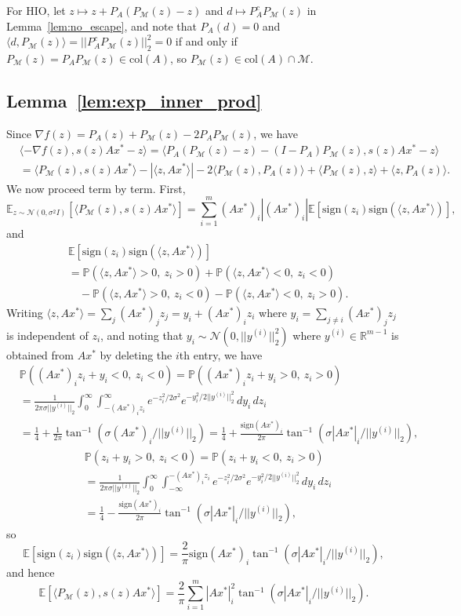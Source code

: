 \documentclass[12pt]{article}
\theoremstyle{definition}
\theoremstyle{remark}
\theoremstyle{definition}
\theoremstyle{problem}
\theoremstyle{definition}
\newcommand{\col}{\text{col}}
\newcommand{\sign}{\text{sign}}
\newcommand{\atan}{\tan^{-1}}
\newcommand{\RR}{\mathbb{R} }
\newcommand{\MM}{\mathcal{M}}
\newcommand{\PP}{\mathbb{P}}
\newcommand{\EE}{\mathbb{E}}
\begin{document}
For HIO, let $z\mapsto z + P_A(P_{\MM}(z)-z)$ and $d\mapsto P_A^cP_{\MM}(z)$ in Lemma~\ref{lem:no_escape}, and note that $P_A(d)=0$ and $\langle d,P_{\MM}(z)\rangle = ||P_A^cP_{\MM}(z)||_2^2 = 0$ if and only if $P_{\MM}(z)=P_AP_{\MM}(z)\in\col(A)$, so $P_{\MM}(z)\in\col(A)\cap\MM$.

\subsection{Lemma~\ref{lem:exp_inner_prod}}\label{sec:pf_exp_inner_prod}
Since $\nabla f(z) = P_A(z) + P_{\MM}(z) - 2P_AP_{\MM}(z)$, we have
\[\begin{aligned} &\langle -\nabla f(z), s(z)Ax^* - z\rangle = \langle P_A(P_{\MM}(z)-z) - (I-P_A)P_{\MM}(z), s(z)Ax^*-z\rangle
\\ &= \langle P_{\MM}(z), s(z)Ax^*\rangle - |\langle z, Ax^*\rangle| -2\langle P_{\MM}(z), P_A(z)\rangle + \langle P_{\MM}(z), z\rangle + \langle z, P_A(z)\rangle. \end{aligned}\]
We now proceed term by term. First,
\[ \EE_{z\sim \mathcal{N}(0,\sigma^2I)}\left[\langle P_{\MM}(z), s(z)Ax^*\rangle\right] = \sum_{i=1}^m(Ax^*)_i|(Ax^*)_i|\EE[\sign(z_i)\sign(\langle z,Ax^*\rangle)],\]
and
\[\begin{aligned}&\EE[\sign(z_i)\sign(\langle z,Ax^*\rangle)]\\
&= \PP(\langle z,Ax^*\rangle > 0,\ z_i>0) + \PP(\langle z,Ax^*\rangle < 0,\ z_i<0)\\
&\quad - \PP(\langle z,Ax^*\rangle > 0,\ z_i<0) - \PP(\langle z,Ax^*\rangle < 0,\ z_i>0).\end{aligned}\]
Writing $\langle z,Ax^*\rangle = \sum_j(Ax^*)_jz_j = y_i + (Ax^*)_iz_i$ where $y_i = \sum_{j\neq i}(Ax^*)_jz_j$ is independent of $z_i$, and noting that $y_i\sim \mathcal{N}(0, ||y^{(i)}||_2^2)$ where $y^{(i)}\in\RR^{m-1}$ is obtained from $Ax^*$ by deleting the $i$th entry, we have
\[\begin{aligned} &\PP((Ax^*)_iz_i + y_i < 0,\ z_i < 0) = \PP((Ax^*)_iz_i + y_i > 0,\ z_i > 0)\\
&= \frac{1}{2\pi\sigma||y^{(i)}||_2}\int_0^{\infty}\int_{-(Ax^*)_iz_i}^{\infty}e^{-z_i^2/2\sigma^2}e^{-y_i^2/2||y^{(i)}||_2^2}\, dy_i\, dz_i\\
&= \frac{1}{4} + \frac{1}{2\pi}\atan(\sigma(Ax^*)_i/||y^{(i)}||_2) = \frac{1}{4} + \frac{\sign(Ax^*)_i}{2\pi}\atan(\sigma|Ax^*|_i/||y^{(i)}||_2),\end{aligned}\]
\[\begin{aligned} &\PP(z_i + y_i > 0,\ z_i < 0) = \PP(z_i + y_i < 0,\ z_i > 0)\\
&= \frac{1}{2\pi\sigma||y^{(i)}||_2}\int_0^{\infty}\int_{-\infty}^{-(Ax^*)_iz_i}e^{-z_i^2/2\sigma^2}e^{-y_i^2/2||y^{(i)}||_2^2}\, dy_i\, dz_i\\
&= \frac{1}{4} - \frac{\sign(Ax^*)_i}{2\pi}\atan(\sigma|Ax^*|_i/||y^{(i)}||_2),\end{aligned}\]
so
\[ \EE[\sign(z_i)\sign(\langle z,Ax^*\rangle)] = \frac{2}{\pi}\sign(Ax^*)_i\atan(\sigma|Ax^*|_i/||y^{(i)}||_2),\]
and hence
\[\EE\left[\langle P_{\MM}(z), s(z)Ax^*\rangle\right] = \frac{2}{\pi}\sum_{i=1}^m|Ax^*|_i^2\atan(\sigma|Ax^*|_i/||y^{(i)}||_2).\]
\end{document}
